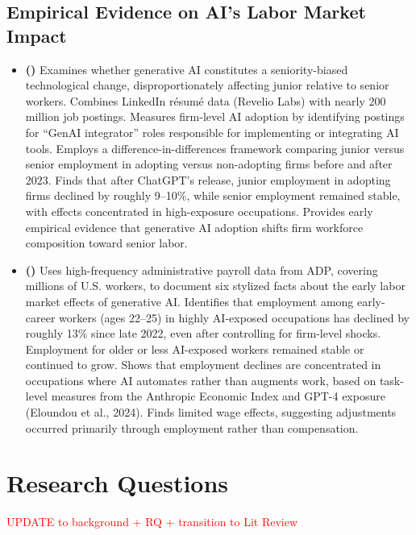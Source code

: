 \documentclass[12pt]{article}
\begin{document}
\subsection{Empirical Evidence on AI's Labor Market Impact}

\begin{itemize}[leftmargin=*]

    \item \textbf{(\cite{hosseini2025seniority})}  
Examines whether generative AI constitutes a seniority-biased technological change, disproportionately affecting junior relative to senior workers.  
Combines LinkedIn résumé data (Revelio Labs) with nearly 200 million job postings. Measures firm-level AI adoption by identifying postings for ``GenAI integrator'' roles responsible for implementing or integrating AI tools. Employs a difference-in-differences framework comparing junior versus senior employment in adopting versus non-adopting firms before and after 2023.  
Finds that after ChatGPT’s release, junior employment in adopting firms declined by roughly 9–10\%, while senior employment remained stable, with effects concentrated in high-exposure occupations.  Provides early empirical evidence that generative AI adoption shifts firm workforce composition toward senior labor.
\item \textbf{(\cite{brynjolfsson2025canaries})}  
Uses high-frequency administrative payroll data from ADP, covering millions of U.S. workers, to document six stylized facts about the early labor market effects of generative AI.  
Identifies that employment among early-career workers (ages 22–25) in highly AI-exposed occupations has declined by roughly 13\% since late 2022, even after controlling for firm-level shocks.  
Employment for older or less AI-exposed workers remained stable or continued to grow.  
Shows that employment declines are concentrated in occupations where AI automates rather than augments work, based on task-level measures from the Anthropic Economic Index and GPT-4 exposure (Eloundou et al., 2024).  
Finds limited wage effects, suggesting adjustments occurred primarily through employment rather than compensation.  
\end{itemize}

\iffalse
\section{Research Questions}
\textcolor{red}{UPDATE to background + RQ + transition to Lit Review}
\end{document}
